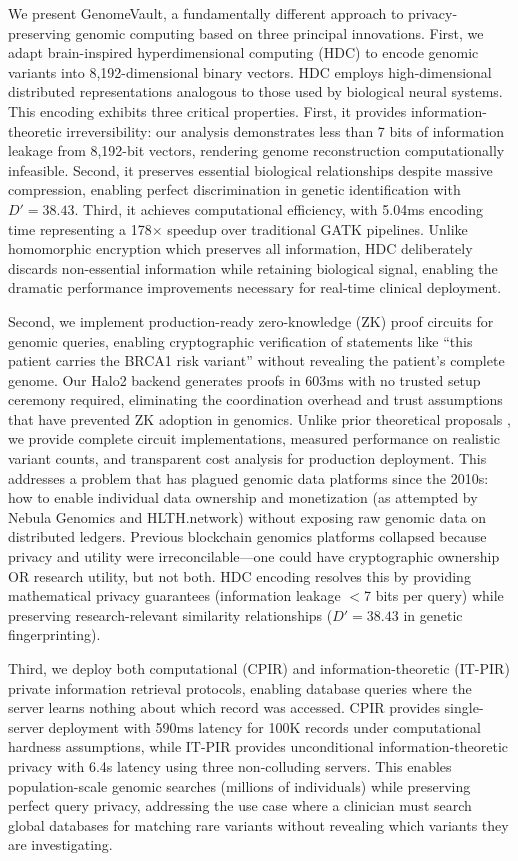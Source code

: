 \documentclass[11pt,letterpaper]{article}
\begin{document}
We present GenomeVault, a fundamentally different approach to privacy-preserving genomic computing based on three principal innovations. First, we adapt brain-inspired hyperdimensional computing (HDC) to encode genomic variants into 8,192-dimensional binary vectors. HDC employs high-dimensional distributed representations analogous to those used by biological neural systems. This encoding exhibits three critical properties. First, it provides information-theoretic irreversibility: our analysis demonstrates less than 7 bits of information leakage from 8,192-bit vectors, rendering genome reconstruction computationally infeasible. Second, it preserves essential biological relationships despite massive compression, enabling perfect discrimination in genetic identification with $D'=38.43$. Third, it achieves computational efficiency, with 5.04ms encoding time representing a 178$\times$ speedup over traditional GATK pipelines. Unlike homomorphic encryption which preserves all information, HDC deliberately discards non-essential information while retaining biological signal, enabling the dramatic performance improvements necessary for real-time clinical deployment.

Second, we implement production-ready zero-knowledge (ZK) proof circuits for genomic queries, enabling cryptographic verification of statements like ``this patient carries the BRCA1 risk variant'' without revealing the patient's complete genome. Our Halo2 backend generates proofs in 603ms with no trusted setup ceremony required, eliminating the coordination overhead and trust assumptions that have prevented ZK adoption in genomics. Unlike prior theoretical proposals \cite{bogatyy2020}, we provide complete circuit implementations, measured performance on realistic variant counts, and transparent cost analysis for production deployment. This addresses a problem that has plagued genomic data platforms since the 2010s: how to enable individual data ownership and monetization (as attempted by Nebula Genomics and HLTH.network) without exposing raw genomic data on distributed ledgers. Previous blockchain genomics platforms collapsed because privacy and utility were irreconcilable---one could have cryptographic ownership OR research utility, but not both. HDC encoding resolves this by providing mathematical privacy guarantees (information leakage $<$7 bits per query) while preserving research-relevant similarity relationships ($D'=38.43$ in genetic fingerprinting).

Third, we deploy both computational (CPIR) and information-theoretic (IT-PIR) private information retrieval protocols, enabling database queries where the server learns nothing about which record was accessed. CPIR provides single-server deployment with 590ms latency for 100K records under computational hardness assumptions, while IT-PIR provides unconditional information-theoretic privacy with 6.4s latency using three non-colluding servers. This enables population-scale genomic searches (millions of individuals) while preserving perfect query privacy, addressing the use case where a clinician must search global databases for matching rare variants without revealing which variants they are investigating.
\end{document}
